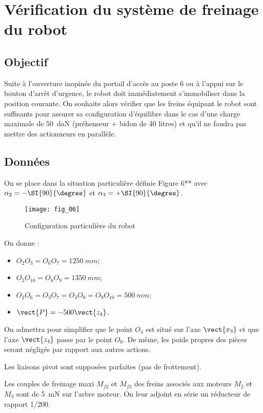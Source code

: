 \section{Vérification du système de freinage du robot}
\subsection{Objectif }

Suite à l’ouverture inopinée du portail d’accès au poste 6 ou à l’appui sur le bouton d’arrêt 
d’urgence, le robot doit immédiatement s’immobiliser dans la position courante. On souhaite 
alors vérifier que les freins équipant le robot sont suffisants pour assurer sa configuration 
d’équilibre dans le cas d’une charge maximale de \SI{50}{daN} (préhenseur + bidon de 40 litres) et 
qu’il ne faudra pas mettre des actionneurs en parallèle.


\subsection{Données}
On se place dans la situation particulière définie Figure 6** avec $\alpha_2= -\SI{90}{\degres}$ et $\alpha_3= +\SI{90}{\degres}$.

\begin{figure}[!h]
\centering
\texttt{[image: fig\_06]}
\caption{Configuration particulière du robot\label{kuka:fig:06}}
\end{figure}


On donne : 
\begin{itemize}
\item $O_2O_3 = O_6O_7 = \SI{1250}{mm}$; 
\item $O_3O_{10} = O_8O_9 = \SI{1350}{mm}$; 
\item $O_2O_6 = O_3O_7 = O_3O_8 = O_9O_{10} = \SI{500}{mm}$; 
\item $\vect{P} = -500\vect{z_4}$. 
\end{itemize}

On admettra pour simplifier que le point $O_4$ est situé sur l’axe $\vect{x_3}$ et que l’axe $\vect{z_4}$ passe par le point $O_9$. De même, les poids propres des pièces seront négligés par rapport aux autres 
actions. 

Les liaisons pivot sont supposées parfaites (pas de frottement). 

Les couples de freinage maxi $M_{f2}$ et $M_{f3}$ des freins associés aux moteurs $M_2$ et $M_3$ sont de 
\SI{5}{mN} sur l’arbre moteur. On leur adjoint en série un réducteur de rapport 1/200.

